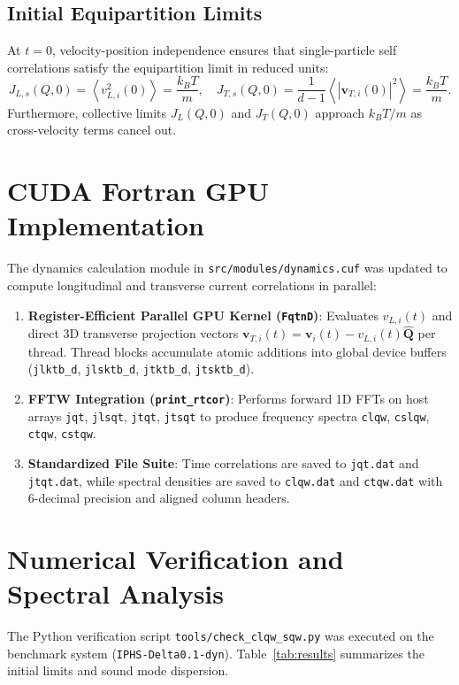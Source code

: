 \documentclass[11pt,a4paper]{article}
\begin{document}
\subsection{Initial Equipartition Limits}
At $t = 0$, velocity-position independence ensures that single-particle self correlations satisfy the equipartition limit in reduced units:
\begin{equation}
J_{L,s}(Q,0) = \left\langle v_{L,i}^2(0) \right\rangle = \frac{k_B T}{m}, \quad J_{T,s}(Q,0) = \frac{1}{d-1} \left\langle |\mathbf{v}_{T,i}(0)|^2 \right\rangle = \frac{k_B T}{m}.
\end{equation}
Furthermore, collective limits $J_L(Q,0)$ and $J_T(Q,0)$ approach $k_B T/m$ as cross-velocity terms cancel out.

\section{CUDA Fortran GPU Implementation}

The dynamics calculation module in \texttt{src/modules/dynamics.cuf} was updated to compute longitudinal and transverse current correlations in parallel:
\begin{enumerate}
    \item \textbf{Register-Efficient Parallel GPU Kernel (\texttt{FqtnD})}: Evaluates $v_{L,i}(t)$ and direct 3D transverse projection vectors $\mathbf{v}_{T,i}(t) = \mathbf{v}_i(t) - v_{L,i}(t)\hat{\mathbf{Q}}$ per thread. Thread blocks accumulate atomic additions into global device buffers (\texttt{jlktb\_d}, \texttt{jlsktb\_d}, \texttt{jtktb\_d}, \texttt{jtsktb\_d}).
    \item \textbf{FFTW Integration (\texttt{print\_rtcor})}: Performs forward 1D FFTs on host arrays \texttt{jqt}, \texttt{jlsqt}, \texttt{jtqt}, \texttt{jtsqt} to produce frequency spectra \texttt{clqw}, \texttt{cslqw}, \texttt{ctqw}, \texttt{cstqw}.
    \item \textbf{Standardized File Suite}: Time correlations are saved to \texttt{jqt.dat} and \texttt{jtqt.dat}, while spectral densities are saved to \texttt{clqw.dat} and \texttt{ctqw.dat} with 6-decimal precision and aligned column headers.
\end{enumerate}

\section{Numerical Verification and Spectral Analysis}

The Python verification script \texttt{tools/check\_clqw\_sqw.py} was executed on the benchmark system (\texttt{IPHS-Delta0.1-dyn}). Table~\ref{tab:results} summarizes the initial limits and sound mode dispersion.
\end{document}
